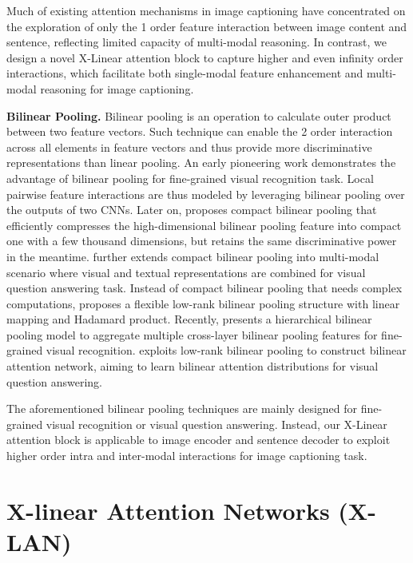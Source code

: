 \documentclass[10pt,twocolumn,letterpaper]{article}
\begin{document}
Much of existing attention mechanisms in image captioning have concentrated on the exploration of only the 1 order feature interaction between image content and sentence, reflecting limited capacity of multi-modal reasoning. In contrast, we design a novel X-Linear attention block to capture higher and even infinity order interactions, which facilitate both single-modal feature enhancement and multi-modal reasoning for image captioning.


\textbf{Bilinear Pooling.} Bilinear pooling is an operation to calculate outer product between two feature vectors. Such technique can enable the 2 order interaction across all elements in feature vectors and thus provide more discriminative representations than linear pooling. An early pioneering work \cite{lin2015bilinear} demonstrates the advantage of bilinear pooling for fine-grained visual recognition task. Local pairwise feature interactions are thus modeled by leveraging bilinear pooling over the outputs of two CNNs. Later on, \cite{gao2016compact} proposes compact bilinear pooling that efficiently compresses the high-dimensional bilinear pooling feature into compact one with a few thousand dimensions, but retains the same discriminative power in the meantime. \cite{fukui2016multimodal} further extends compact bilinear pooling into multi-modal scenario where visual and textual representations are combined for visual question answering task. Instead of compact bilinear pooling that needs complex computations, \cite{kim2016hadamard} proposes a flexible low-rank bilinear pooling structure with linear mapping and Hadamard product. Recently, \cite{yu2018hierarchical} presents a hierarchical bilinear pooling model to aggregate multiple cross-layer bilinear pooling features for fine-grained visual recognition. \cite{kim2018bilinear} exploits low-rank bilinear pooling to construct bilinear attention network, aiming to learn bilinear attention distributions for visual question answering.

The aforementioned bilinear pooling techniques are mainly designed for fine-grained visual recognition or visual question answering. Instead, our X-Linear attention block is applicable to image encoder and sentence decoder to exploit higher order intra and inter-modal interactions for image captioning task.





\section{X-linear Attention Networks (X-LAN)}
\end{document}
